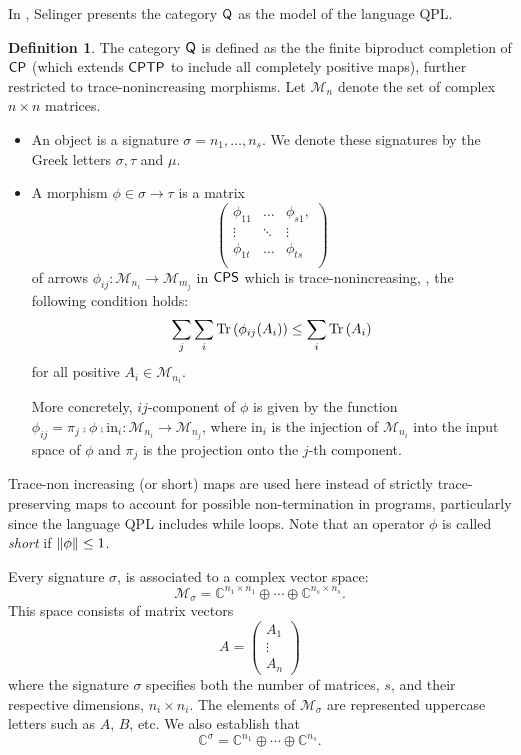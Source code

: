 \documentclass[10pt,a4paper]{amsart}
\theoremstyle{definition}
\newtheorem{definition}{Definition}[section]
\theoremstyle{definition}
\theoremstyle{definition}
\theoremstyle{definition}
\theoremstyle{definition}
\theoremstyle{definition}
\begin{document}

In \cite{selinger04}, Selinger presents the category $\mathsf{Q}$ as the model of the language QPL.  

\begin{definition} \label{def:catQ}
  The category $\mathsf{Q}$ is defined as the the finite biproduct completion of $\mathsf{CP}$ (which extends $\mathsf{CPTP}$ to include all completely positive maps),  further restricted to trace-nonincreasing morphisms. Let  $\mathcal{M}_n$ denote the set of complex $n\times n$ matrices.
  \begin{itemize}
    \item An object is a signature $\sigma= n_1, \ldots, n_s$. We denote these signatures by the Greek letters $\sigma, \tau$ and $\mu$.
    \item A morphism $\phi \in \sigma \to \tau $ is a matrix
    $$\begin{pmatrix}
      \phi_{11} & \ldots & \phi_{s1}, \\
      \vdots & \ddots  & \vdots \\
      \phi_{1t} & \ldots & \phi_{ts} \\
    \end{pmatrix}$$
    of arrows $\phi_{ij}: \mathcal{M}_{n_i} \rightarrow \mathcal{M}_{m_j}$ in $\mathsf{CPS}$ which is trace-nonincreasing, \ie, the following condition holds:
    $$ \sum_j \sum_i \text{Tr} \left(\phi_{ij} (A_i)\right)   \leq  \sum_i \text{Tr} \left(A_i\right) $$
   for all positive $A_i \in \mathcal{M}_{n_i}$.

    More concretely, $ij$-component of $\phi$ is given by the function $\phi_{ij} = \pi_{j} \comp \phi \comp \mathrm{in}_{i} : \mathcal{M}_{n_i} \rightarrow \mathcal{M}_{n_j} $, where $\mathrm{in}_{i}$ is the injection of  $\mathcal{M}_{n_i}$ into the input space of $\phi$ and  $\pi_{j}$ is the projection onto the $j$-th component.
  \end{itemize}
\end{definition}


 Trace-non increasing (or short) maps are used here instead of strictly trace-preserving maps to account for possible non-termination in programs, particularly since the language  QPL includes while loops. Note that an operator $ \phi $ is called \emph{short} if $\left\lVert \phi \right\rVert \leq 1$.


 Every signature $\sigma$, is associated to  a complex vector space:
\[
\mathcal{M}_\sigma = \mathbb{C}^{n_1 \times n_1} \oplus \cdots \oplus \mathbb{C}^{n_s \times n_s}.
\]
This space consists of matrix vectors 
$$A = \begin{pmatrix} A_1 \\ \vdots \\ A_n \end{pmatrix}$$
where the signature $\sigma$ specifies both the number of matrices, $s$,  and their respective dimensions, $n_i \times n_i$. The elements of $\mathcal{M}_\sigma$ are represented uppercase letters such as $A$, $B$, etc.
We also establish that
\[
\mathbb{C}^\sigma = \mathbb{C}^{n_1} \oplus \cdots \oplus \mathbb{C}^{n_s}.
\]
\end{document}

